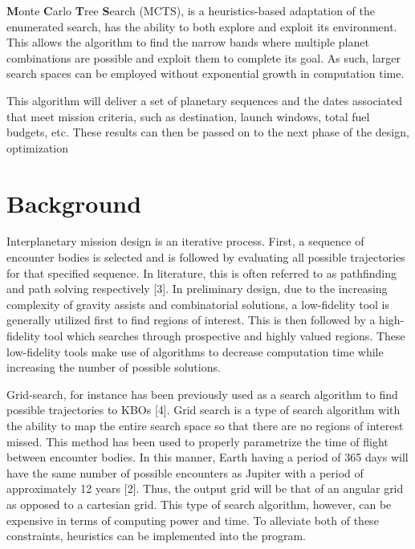 \documentclass[letterpaper, preprint, paper,11pt]{AAS}	%
\begin{document}
\textbf{M}onte \textbf{C}arlo \textbf{T}ree \textbf{S}earch (MCTS), is a heuristics-based adaptation of the enumerated search, has the ability to both explore and exploit its environment. This allows the algorithm to find the narrow bands where multiple planet combinations are possible and exploit them to complete its goal. As such, larger search spaces can be employed without exponential growth in computation time.

This algorithm will deliver a set of planetary sequences and the dates associated that meet mission criteria, such as destination, launch windows, total fuel budgets, etc. These results can then be passed on to the next phase of the design, optimization 


\section{Background}

Interplanetary mission design is an iterative process. First, a sequence of encounter bodies is selected and is followed by evaluating all possible trajectories for that specified sequence. In literature, this is often referred to as pathfinding and path solving respectively [3]. In preliminary design, due to the increasing complexity of gravity assists and combinatorial solutions, a low-fidelity tool is generally utilized first to find regions of interest. This is then followed by a high-fidelity tool which searches through prospective and highly valued regions. These low-fidelity tools make use of algorithms to decrease computation time while increasing the number of possible solutions. 

Grid-search, for instance has been previously used as a search algorithm to find possible trajectories to KBOs [4]. Grid search is a type of search algorithm with the ability to map the entire search space so that there are no regions of interest missed. This method has been used to properly parametrize the time of flight between encounter bodies. In this manner, Earth having a period of 365 days will have the same number of possible encounters as Jupiter with a period of approximately 12 years [2]. Thus, the output grid will be that of an angular grid as opposed to a cartesian grid. This type of search algorithm, however, can be expensive in terms of computing power and time. To alleviate both of these constraints, heuristics can be implemented into the program. 
\end{document}
